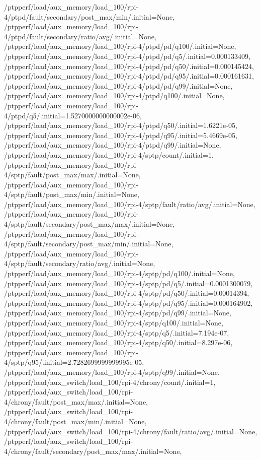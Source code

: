 {    /ptpperf/load/aux_memory/load_100/rpi-4/ptpd/fault/secondary/post_max/min/.initial=None,
    /ptpperf/load/aux_memory/load_100/rpi-4/ptpd/fault/secondary/ratio/avg/.initial=None,
    /ptpperf/load/aux_memory/load_100/rpi-4/ptpd/pd/q100/.initial=None,
    /ptpperf/load/aux_memory/load_100/rpi-4/ptpd/pd/q5/.initial=0.000133409,
    /ptpperf/load/aux_memory/load_100/rpi-4/ptpd/pd/q50/.initial=0.000145424,
    /ptpperf/load/aux_memory/load_100/rpi-4/ptpd/pd/q95/.initial=0.000161631,
    /ptpperf/load/aux_memory/load_100/rpi-4/ptpd/pd/q99/.initial=None,
    /ptpperf/load/aux_memory/load_100/rpi-4/ptpd/q100/.initial=None,
    /ptpperf/load/aux_memory/load_100/rpi-4/ptpd/q5/.initial=1.5270000000000002e-06,
    /ptpperf/load/aux_memory/load_100/rpi-4/ptpd/q50/.initial=1.6221e-05,
    /ptpperf/load/aux_memory/load_100/rpi-4/ptpd/q95/.initial=5.4669e-05,
    /ptpperf/load/aux_memory/load_100/rpi-4/ptpd/q99/.initial=None,
    /ptpperf/load/aux_memory/load_100/rpi-4/sptp/count/.initial=1,
    /ptpperf/load/aux_memory/load_100/rpi-4/sptp/fault/post_max/max/.initial=None,
    /ptpperf/load/aux_memory/load_100/rpi-4/sptp/fault/post_max/min/.initial=None,
    /ptpperf/load/aux_memory/load_100/rpi-4/sptp/fault/ratio/avg/.initial=None,
    /ptpperf/load/aux_memory/load_100/rpi-4/sptp/fault/secondary/post_max/max/.initial=None,
    /ptpperf/load/aux_memory/load_100/rpi-4/sptp/fault/secondary/post_max/min/.initial=None,
    /ptpperf/load/aux_memory/load_100/rpi-4/sptp/fault/secondary/ratio/avg/.initial=None,
    /ptpperf/load/aux_memory/load_100/rpi-4/sptp/pd/q100/.initial=None,
    /ptpperf/load/aux_memory/load_100/rpi-4/sptp/pd/q5/.initial=0.0001300079,
    /ptpperf/load/aux_memory/load_100/rpi-4/sptp/pd/q50/.initial=0.00014394,
    /ptpperf/load/aux_memory/load_100/rpi-4/sptp/pd/q95/.initial=0.000164902,
    /ptpperf/load/aux_memory/load_100/rpi-4/sptp/pd/q99/.initial=None,
    /ptpperf/load/aux_memory/load_100/rpi-4/sptp/q100/.initial=None,
    /ptpperf/load/aux_memory/load_100/rpi-4/sptp/q5/.initial=7.194e-07,
    /ptpperf/load/aux_memory/load_100/rpi-4/sptp/q50/.initial=8.297e-06,
    /ptpperf/load/aux_memory/load_100/rpi-4/sptp/q95/.initial=2.7282699999999995e-05,
    /ptpperf/load/aux_memory/load_100/rpi-4/sptp/q99/.initial=None,
    /ptpperf/load/aux_switch/load_100/rpi-4/chrony/count/.initial=1,
    /ptpperf/load/aux_switch/load_100/rpi-4/chrony/fault/post_max/max/.initial=None,
    /ptpperf/load/aux_switch/load_100/rpi-4/chrony/fault/post_max/min/.initial=None,
    /ptpperf/load/aux_switch/load_100/rpi-4/chrony/fault/ratio/avg/.initial=None,
    /ptpperf/load/aux_switch/load_100/rpi-4/chrony/fault/secondary/post_max/max/.initial=None,
}
